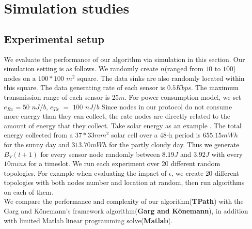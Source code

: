 \documentclass{article}
\begin{document}
\section{Simulation studies}
\subsection{Experimental setup}
We evaluate the performance of our algorithm via simulation in this section.
Our simulation setting is as follows. We randomly create $n$(ranged from $10$ to $100$) nodes
on a $100*100$ $m^2$ square. The data sinks are also randomly located within this square. The data generating rate of each sensor is $0.5 Kbps$. The maximum transmission range of each sensor is $25 m$. For power consumption model, we set $e_{Rx} = 50$ $nJ/b$, $e_{Tx}$ $=$ $100$ $nJ/b$ Since nodes in our protocol do not 
consume more energy than they can collect, the rate nodes are directly related to the amount of energy that they collect. Take solar energy as an example \cite{E00P}. The total energy collected from a $37 * 33 mm^2$ solar cell over a 48-h period is $655.15 mWh$ for the sunny day and $313.70 mWh$ for the partly cloudy day. Thus we generate $B_V(t+1)$ for every sensor node randomly between $8.19 J$ and $3.92 J$ with every $10 mins$ for a timeslot. We run each experiment over 20 different random topologies. For example when evaluating the impact of $\epsilon$, we create 20 different topologies with both nodes number and location at random, then run algorithms on each of them.\\
We compare the performance and complexity of our algorithm(\textbf{TPath}) with the Garg and K\"{o}nemann's framework algorithm(\textbf{Garg and K\"{o}nemann}), in addition with limited Matlab linear programming solve(\textbf{Matlab}).







\end{document}
